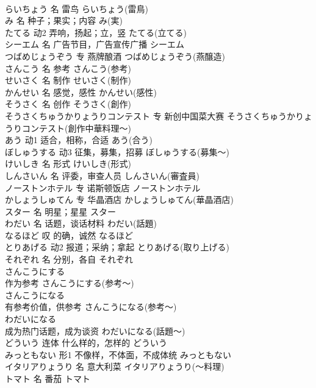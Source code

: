 \documentclass[8pt]{extreport}
\begin{document}
\begin{CJK}{UTF8}{min}
\\	らいちょう	名	雷鸟	らいちょう(雷鳥)	
\\	み	名	种子；果实；内容	み(実)	
\\	たてる	动2	弄响，扬起；立，竖	たてる(立てる)	
\\	シーエム	名	广告节目，广告宣传广播	シーエム
\\	つばめじょうぞう	专	燕牌酿酒	つばめじょうぞう(燕醸造)	
\\	さんこう	名	参考	さんこう(参考)	
\\	せいさく	名	制作	せいさく(制作)	
\\	かんせい	名	感觉，感性	かんせい(感性)	
\\	そうさく	名	创作	そうさく(創作)	
\\	そうさくちゅうかりょうりコンテスト	专	新创中国菜大赛	そうさくちゅうかりょうりコンテスト(創作中華料理～)	
\\	あう	动1	适合，相称，合适	あう(合う)	
\\	ぼしゅうする	动3	征集，募集，招募	ぼしゅうする(募集～)	
\\	けいしき	名	形式	けいしき(形式)	
\\	しんさいん	名	评委，审查人员	しんさいん(審査員)	
\\	ノーストンホテル	专	诺斯顿饭店	ノーストンホテル	
\\	かしょうしゅてん	专	华晶酒店	かしょうしゅてん(華晶酒店)	
\\	スター	名	明星；星星	スター	
\\	わだい	名	话题，谈话材料	わだい(話題)	
\\	なるほど	叹	的确，诚然	なるほど	
\\	とりあげる	动2	报道；采纳；拿起	とりあげる(取り上げる)	
\\	それぞれ	名	分别，各自	それぞれ	
\\	さんこうにする	
\\	作为参考	さんこうにする(参考～)	
\\	さんこうになる	
\\	有参考价值，供参考	さんこうになる(参考～)	
\\	わだいになる	
\\	成为热门话题，成为谈资	わだいになる(話題～)	
\\	どういう	连体	什么样的，怎样的	どういう	
\\	みっともない	形1	不像样，不体面，不成体统	みっともない	
\\	イタリアりょうり	名	意大利菜	イタリアりょうり(～料理)	
\\	トマト	名	番茄	トマト	

\end{CJK}
\end{document}
